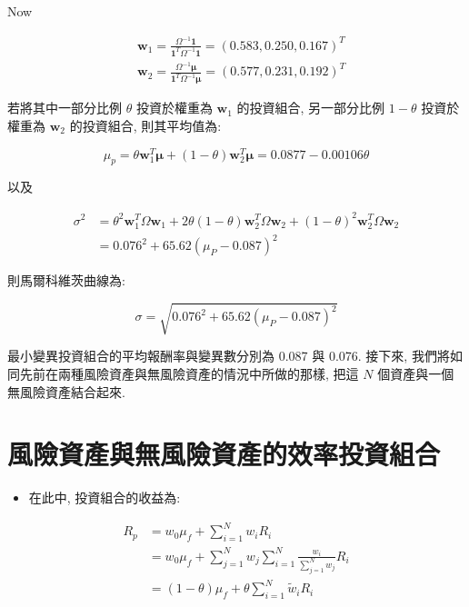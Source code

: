 \documentclass[letterpaper]{article}
\begin{document}
		Now
		
		$$
		\begin{aligned}
			& \mathbf{w}_{1}=\frac{\Omega^{-1} \mathbf{1}}{\mathbf{1}^{T} \Omega^{-1} \mathbf{1}}= (0.583, 0.250, 0.167) ^{T} \\
			& \mathbf{w}_{2}=\frac{\Omega^{-1} \boldsymbol{\mu}}{\mathbf{1}^{T} \Omega^{-1} \boldsymbol{\mu}}= (0.577, 0.231, 0.192) ^{T}
		\end{aligned}
		$$
		
		若將其中一部分比例 $\theta$ 投資於權重為 $\mathbf{w}_{1}$ 的投資組合, 另一部分比例 $1-\theta$ 投資於權重為 $\mathbf{w}_{2}$ 的投資組合, 則其平均值為: 
		
		
		$$
		\mu_{p}=\theta \mathbf{w}_{1}^{T} \boldsymbol{\mu}+ (1-\theta) \mathbf{w}_{2}^{T} \boldsymbol{\mu}=0.0877-0.00106 \theta
		$$
		
		以及
		
		$$
		\begin{aligned}
			\sigma^{2} & =\theta^{2} \mathbf{w}_{1}^{T} \Omega \mathbf{w}_{1}+2 \theta (1-\theta) \mathbf{w}_{2}^{T} \Omega \mathbf{w}_{2}+ (1-\theta) ^{2} \mathbf{w}_{2}^{T} \Omega \mathbf{w}_{2} \\
			& =0.076^{2}+65.62\left (\mu_{P}-0.087\right) ^{2}
		\end{aligned}
		$$
		
		則馬爾科維茨曲線為: 
		
		$$
		\sigma=\sqrt{0.076^{2}+65.62\left (\mu_{P}-0.087\right) ^{2}}
		$$
		
		最小變異投資組合的平均報酬率與變異數分別為 0.087 與 0.076. 接下來, 我們將如同先前在兩種風險資產與無風險資產的情況中所做的那樣, 把這 $N$ 個資產與一個無風險資產結合起來. 
		
		
		\section{風險資產與無風險資產的效率投資組合}
		\begin{itemize}
			\item 在此中, 投資組合的收益為: 
		\end{itemize}
		
		$$
		\begin{aligned}
			R_{p} & =w_{0} \mu_{f}+\sum_{i=1}^{N} w_{i} R_{i} \\
			& =w_{0} \mu_{f}+\sum_{j=1}^{N} w_{j} \sum_{i=1}^{N} \frac{w_{i}}{\sum_{j=1}^{N} w_{j}} R_{i} \\
			& = (1-\theta) \mu_{f}+\theta \sum_{i=1}^{N} \tilde{w}_{i} R_{i}
		\end{aligned}
		$$
		
\end{document}
